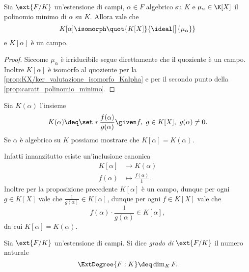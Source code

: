 \begin{proposition}
    Sia $\ext{F/K}$ un'estensione di campi, $\alpha \in F$ algebrico su $K$ e $\mu_\alpha \in \K[X]$ il polinomio minimo di $\alpha$ su $K$. Allora vale che \[
        K[\alpha] \isomorph \quot{K[X]}{\ideal[\big]{\mu_\alpha}}
    \] e $K[\alpha]$ è un campo.
\end{proposition}
\begin{proof}
    Siccome $\mu_\alpha$ è irriducibile segue direttamente che il quoziente è un campo. Inoltre $K[\alpha]$ è isomorfo al quoziente per la \autoref{prop:KX/ker_valutazione_isomorfo_Kalpha} e per il secondo punto della \autoref{prop:caratt_polinomio_minimo}.
\end{proof}

\begin{remark}
    Sia $K(\alpha)$ l'insieme \[
        K(\alpha) \deq \set*{\frac{f(\alpha)}{g(\alpha)} \given f,\ g \in K[X],\ g(\alpha) \neq 0}.    
    \] Se $\alpha$ è algebrico su $K$ possiamo mostrare che $K[\alpha] = K(\alpha)$.

    Infatti innanzitutto esiste un'inclusione canonica \begin{align*}
        K[\alpha] &\to K(\alpha)\\
        f(\alpha) &\mapsto \frac{f(\alpha)}{1}.
    \end{align*} Inoltre per la proposizione precedente $K[\alpha]$ è un campo, dunque per ogni $g \in K[X]$ vale che $\frac{1}{g(\alpha)} \in K[\alpha]$, dunque per ogni $f \in K[X]$ vale che \[
        f(\alpha) \cdot \frac{1}{g(\alpha)} \in K[\alpha],    
    \] da cui $K[\alpha] = K(\alpha)$.
\end{remark}

\begin{definition}
    Sia $\ext{F/K}$ un'estensione di campi. Si dice \emph{grado di} $\ext{F/K}$ il numero naturale \[
        \ExtDegree{F : K} \deq \dim_K F.    
    \]
\end{definition}

